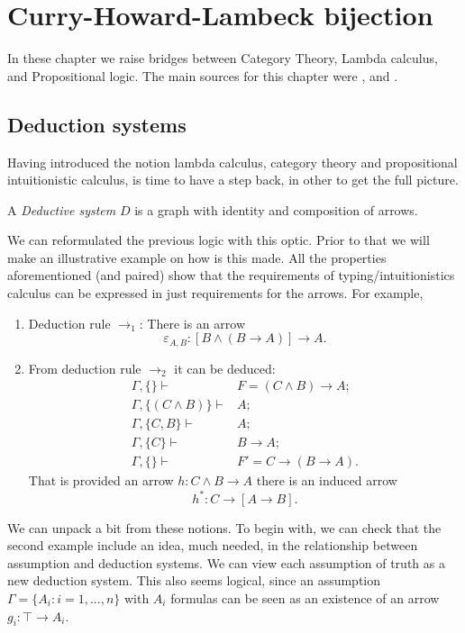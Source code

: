 
\chapter{Curry-Howard-Lambeck bijection}
In these chapter we raise bridges between Category Theory, Lambda calculus, and Propositional logic. The main sources for this chapter were  \cite{lambek1988introduction}, \cite{lambek1985cartesian} and \cite[Chapter 6]{selinger2008lecture}.\\


\section{Deduction systems}
Having introduced the notion lambda calculus, category theory and propositional intuitionistic calculus, is time to have a step back, in other to get the full picture.

\begin{definition}
  A \emph{Deductive system} $D$ is a graph  with identity and composition of arrows.
\end{definition}

We can reformulated the previous logic with this optic. Prior to that we will make an illustrative example on how is this made. All the properties aforementioned (and paired) show that the requirements of typing/intuitionistics calculus can be expressed in just requirements for the arrows. For example, 
\begin{example}
  \begin{enumerate}
  \item Deduction rule $\to_1$: There is an arrow $$\varepsilon_{A,B}: [B\land (B \to A)] \to A.$$
  \item From deduction rule $\to_2$ it can be deduced:
    \begin{align*}
      \Gamma,\{\} \vdash & F= (C\land B)\to A;\\
      \Gamma, \{(C\land B)\} \vdash & A;\\
      \Gamma, \{C, B\} \vdash & A;\\
      \Gamma, \{C\} \vdash & B\to A;\\
      \Gamma, \{\} \vdash & F'=C \to (B \to A).
    \end{align*}
    That is provided an arrow $h: C\land B \to A$ there is an induced arrow
    $$h^*:C \to [A\to B].$$
  \end{enumerate}
\end{example}

We can unpack a bit from these notions. To begin with, we can check that the second example include an idea, much needed, in the relationship between assumption and deduction systems. We can view each assumption of truth as a new deduction system. This also seems logical, since an assumption $\Gamma = \{A_i : i=1,...,n\}$  with $A_i$ formulas can be seen as an existence of an arrow $g_i: \top \to A_i$.\\

